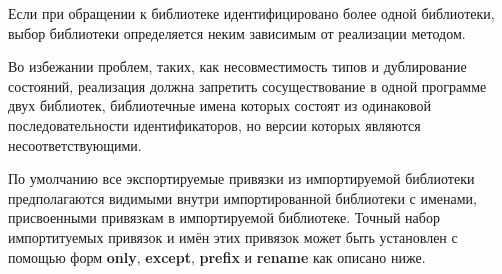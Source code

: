 Если при обращении к библиотеке идентифицировано более одной библиотеки, выбор библиотеки
определяется неким зависимым от реализации методом.

Во избежании проблем, таких, как несовместимость типов и дублирование состояний, реализация
должна запретить сосуществование в одной программе двух библиотек, библиотечные имена которых
состоят из одинаковой последовательности идентификаторов, но версии которых являются
несоответствующими.

По умолчанию все экспортируемые привязки из импортируемой библиотеки предполагаются видимыми
внутри импортированной библиотеки с именами, присвоенными привязкам в импортируемой
библиотеке. Точный набор импортитуемых привязок и имён этих привязок может быть установлен с
помощью форм {\cf\bfseries only}, {\cf\bfseries except}, {\cf\bfseries prefix} и {\cf\bfseries
rename} как описано ниже.

